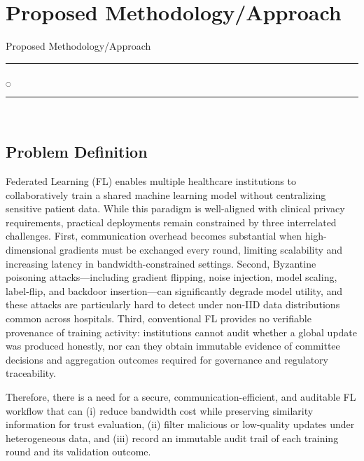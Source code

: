 \chapter[Proposed Methodology/Approach]{Proposed Methodology/Approach}{Proposed Methodology/Approach}\label{pm}

\rule{0.49\textwidth}{0.75pt} $_{\bigcirc}$ \rule{0.49\textwidth}{0.75pt}\\
\section{Problem Definition}
Federated Learning (FL) enables multiple healthcare institutions to collaboratively train a shared machine learning model without centralizing sensitive patient data. While this paradigm is well-aligned with clinical privacy requirements, practical deployments remain constrained by three interrelated challenges. First, communication overhead becomes substantial when high-dimensional gradients must be exchanged every round, limiting scalability and increasing latency in bandwidth-constrained settings. Second, Byzantine poisoning attacks---including gradient flipping, noise injection, model scaling, label-flip, and backdoor insertion---can significantly degrade model utility, and these attacks are particularly hard to detect under non-IID data distributions common across hospitals. Third, conventional FL provides no verifiable provenance of training activity: institutions cannot audit whether a global update was produced honestly, nor can they obtain immutable evidence of committee decisions and aggregation outcomes required for governance and regulatory traceability.

Therefore, there is a need for a secure, communication-efficient, and auditable FL workflow that can (i) reduce bandwidth cost while preserving similarity information for trust evaluation, (ii) filter malicious or low-quality updates under heterogeneous data, and (iii) record an immutable audit trail of each training round and its validation outcome.




